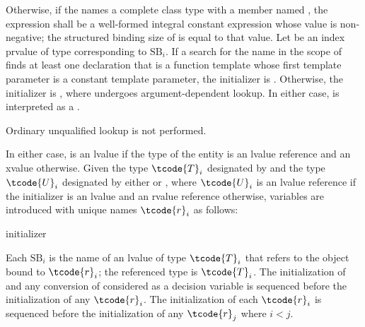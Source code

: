 \pnum
Otherwise, if
the  
names a complete class type with a member named ,
the expression 
shall be a well-formed integral constant expression
whose value is non-negative;
the structured binding size of  is equal to that value.
Let  be an index prvalue of type 
corresponding to $\textrm{SB}_i$.
If a search for the name 
in the scope of 
finds at least one declaration
that is a function template whose first template parameter
is a constant template parameter,
the initializer is
. Otherwise, the initializer is ,
where  undergoes argument-dependent lookup.
In either case,  is interpreted as a .
\begin{note}
Ordinary unqualified lookup is not performed.
\end{note}
In either case,  is an lvalue if the type of the entity 
is an lvalue reference and an xvalue otherwise.
Given the type $\tcode{T}_i$ designated by
 and
the type $\tcode{U}_i$ designated by
either  or ,
where $\tcode{U}_i$ is an lvalue reference if
the initializer is an lvalue and an rvalue reference otherwise,
variables are introduced with unique names $\tcode{r}_i$ as follows:

\begin{ncbnf}
  initializer \terminal{;}
\end{ncbnf}

Each $\textrm{SB}_i$ is the name of an lvalue of type $\tcode{T}_i$
that refers to the object bound to $\tcode{r}_i$;
the referenced type is $\tcode{T}_i$.
The initialization of  and
any conversion of  considered as a decision variable
is
sequenced before the initialization of any $\tcode{r}_i$.
The initialization of each $\tcode{r}_i$ is
sequenced before the initialization of any $\tcode{r}_j$ where $i < j$.

